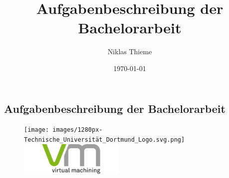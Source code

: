 \documentclass[11pt]{article}
\title{Aufgabenbeschreibung der Bachelorarbeit}
\author{Niklas Thieme}
\date{\today}
\begin{document}
\begin{center}
    \section*{Aufgabenbeschreibung der Bachelorarbeit}
\end{center}

\begin{figure}[t]
    \texttt{[image: images/1280px-Technische\_Universität\_Dortmund\_Logo.svg.png]}\hfill
    \includegraphics[width=5cm]{images/vmLogo.png}
\end{figure}









\newpage


\end{document}
